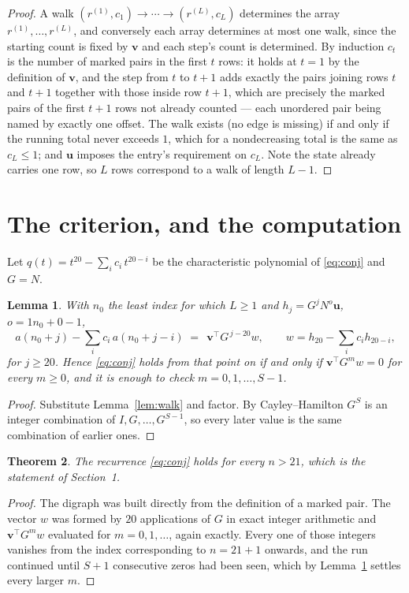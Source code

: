 \documentclass[11pt,a4paper]{article}
\theoremstyle{plain}
\newtheorem{theorem}{Theorem}
\newtheorem{lemma}[theorem]{Lemma}
\theoremstyle{definition}
\begin{document}
\begin{proof}
A walk $(r^{(1)},c_1)\to\cdots\to(r^{(L)},c_L)$ determines the array
$r^{(1)},\dots,r^{(L)}$, and conversely each array determines at most one walk, since the
starting count is fixed by $\mathbf{v}$ and each step's count is determined. By induction
$c_t$ is the number of marked pairs in the first $t$ rows: it holds at $t=1$ by the
definition of $\mathbf{v}$, and the step from $t$ to $t+1$ adds exactly the pairs joining
rows $t$ and $t+1$ together with those inside row $t+1$, which are precisely the marked
pairs of the first $t+1$ rows not already counted --- each unordered pair being named by
exactly one offset. The walk exists (no edge is missing) if and only if the running total
never exceeds $1$, which for a nondecreasing total is the same as $c_L\le1$; and
$\mathbf{u}$ imposes the entry's requirement on $c_L$. Note the state already carries one
row, so $L$ rows correspond to a walk of length $L-1$.
\end{proof}

\section{The criterion, and the computation}

Let $q(t)=t^{20}-\sum_i c_i\,t^{20-i}$ be the characteristic polynomial of
\eqref{eq:conj} and $G=N$.

\begin{lemma}\label{lem:crit}
With $n_0$ the least index for which $L\ge1$ and $h_j=G^{j}N^{o}\mathbf{u}$,
$o=1n_0+0-1$,
\[
a(n_0+j)-\sum_i c_i\,a(n_0+j-i)\;=\;\,\mathbf{v}^{\!\top}G^{\,j-20}w,
\qquad w=h_{20}-\sum_i c_i h_{20-i},
\]
for $j\ge20$. Hence \eqref{eq:conj} holds from that point on if and only if
$\mathbf{v}^{\!\top}G^{m}w=0$ for every $m\ge0$, and it is enough to check
$m=0,1,\dots,S-1$.
\end{lemma}

\begin{proof}
Substitute Lemma~\ref{lem:walk} and factor. By Cayley--Hamilton $G^{S}$ is an integer
combination of $I,G,\dots,G^{S-1}$, so every later value is the same combination of earlier
ones.
\end{proof}

\begin{theorem}
The recurrence \eqref{eq:conj} holds for every $n>21$, which is the statement of
Section~1.
\end{theorem}

\begin{proof}
The digraph was built directly from the definition of a marked pair. The vector $w$ was
formed by $20$ applications of $G$ in exact integer arithmetic and
$\mathbf{v}^{\!\top}G^{m}w$ evaluated for $m=0,1,\dots$, again exactly. Every one of
those integers vanishes from the index corresponding to $n=21+1$ onwards, and the run
continued until $S+1$ consecutive zeros had been seen, which by Lemma~\ref{lem:crit}
settles every larger $m$.
\end{proof}
\end{document}
